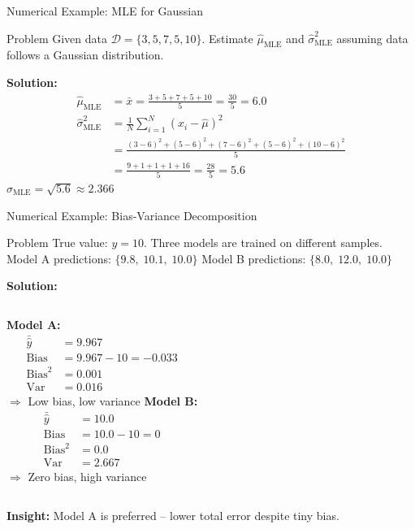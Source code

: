 \begin{frame}{Numerical Example: MLE for Gaussian}
\begin{exampleblock}{Problem}
Given data $\mathcal{D}=\{3, 5, 7, 5, 10\}$. Estimate $\hat{\mu}_{\text{MLE}}$ and $\hat{\sigma}^2_{\text{MLE}}$ assuming data follows a Gaussian distribution.
\end{exampleblock}
\textbf{Solution:}
\begin{align*}
\hat{\mu}_{\text{MLE}} &= \bar{x} = \frac{3+5+7+5+10}{5} = \frac{30}{5} = \mathbf{6.0}\\[6pt]
\hat{\sigma}^2_{\text{MLE}} &= \frac{1}{N}\sum_{i=1}^{N}(x_i - \hat{\mu})^2\\
&= \frac{(3-6)^2+(5-6)^2+(7-6)^2+(5-6)^2+(10-6)^2}{5}\\
&= \frac{9+1+1+1+16}{5} = \frac{28}{5} = \mathbf{5.6}
\end{align*}
$\hat{\sigma}_{\text{MLE}} = \sqrt{5.6} \approx \mathbf{2.366}$
\end{frame}

\begin{frame}{Numerical Example: Bias-Variance Decomposition}
\begin{exampleblock}{Problem}
True value: $y=10$. Three models are trained on different samples.\\
Model A predictions: $\{9.8,\;10.1,\;10.0\}$ \quad Model B predictions: $\{8.0,\;12.0,\;10.0\}$
\end{exampleblock}
\textbf{Solution:}
\begin{columns}[T]
\textbf{Model A:}
\begin{align*}
\bar{\hat{y}} &= 9.967\\
\text{Bias} &= 9.967-10 = -0.033\\
\text{Bias}^2 &= \mathbf{0.001}\\
\text{Var} &= \mathbf{0.016}
\end{align*}
$\Rightarrow$ Low bias, low variance
\textbf{Model B:}
\begin{align*}
\bar{\hat{y}} &= 10.0\\
\text{Bias} &= 10.0-10 = 0\\
\text{Bias}^2 &= \mathbf{0.0}\\
\text{Var} &= \mathbf{2.667}
\end{align*}
$\Rightarrow$ Zero bias, high variance
\end{columns}
\vspace{4pt}
\textbf{Insight:} Model A is preferred -- lower total error despite tiny bias.
\end{frame}

